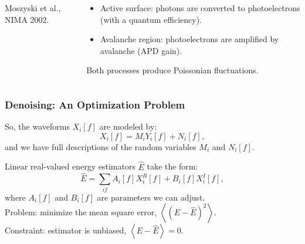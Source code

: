 \documentclass{beamer}
\begin{document}
\begin{frame}
{{\begin{columns}[T]
\begin{column}{.6\textwidth}
{\tiny Moszyski et al., NIMA 2002.}
\end{column}
\begin{column}{.4\textwidth}
\vspace{-0.2cm}\begin{itemize}[leftmargin=*]
\item Active surface: photons are converted to photoelectrons (with a quantum efficiency).
\item Avalanche region: photoelectrons are amplified by avalanche (APD gain).
\end{itemize}
Both processes produce Poissonian fluctuations.
\end{column}
\end{columns}
}}
\end{frame}

\begin{frame}
\begin{center}
\frametitle{Denoising: An Optimization Problem}
\end{center}
So, the waveforms $X_i[f]$ are modeled by:
\[X_i[f] = M_i Y_i[f] + N_i[f],\]
and we have full descriptions of the random variables $M_i$ and $N_i[f]$.

Linear real-valued energy estimators $\widehat{E}$ take the form:
\[\widehat{E} = \sum_{if} A_i[f] X^R_i[f] + B_i[f] X^I_i[f],\]
where $A_i[f]$ and $B_i[f]$ are parameters we can adjust.\\[0.5\baselineskip]

Problem: minimize the mean square error, $\left<\left(E-\widehat{E}\right)^2\right>$.\\[0.5\baselineskip]
Constraint:  estimator is unbiased, $\left<E-\widehat{E}\right>=0$.
\end{frame}
\end{document}
